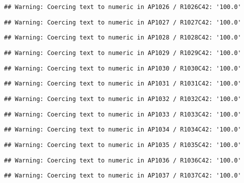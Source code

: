 \documentclass[
]{article}
\begin{document}
\begin{verbatim}
## Warning: Coercing text to numeric in AP1026 / R1026C42: '100.0'
\end{verbatim}

\begin{verbatim}
## Warning: Coercing text to numeric in AP1027 / R1027C42: '100.0'
\end{verbatim}

\begin{verbatim}
## Warning: Coercing text to numeric in AP1028 / R1028C42: '100.0'
\end{verbatim}

\begin{verbatim}
## Warning: Coercing text to numeric in AP1029 / R1029C42: '100.0'
\end{verbatim}

\begin{verbatim}
## Warning: Coercing text to numeric in AP1030 / R1030C42: '100.0'
\end{verbatim}

\begin{verbatim}
## Warning: Coercing text to numeric in AP1031 / R1031C42: '100.0'
\end{verbatim}

\begin{verbatim}
## Warning: Coercing text to numeric in AP1032 / R1032C42: '100.0'
\end{verbatim}

\begin{verbatim}
## Warning: Coercing text to numeric in AP1033 / R1033C42: '100.0'
\end{verbatim}

\begin{verbatim}
## Warning: Coercing text to numeric in AP1034 / R1034C42: '100.0'
\end{verbatim}

\begin{verbatim}
## Warning: Coercing text to numeric in AP1035 / R1035C42: '100.0'
\end{verbatim}

\begin{verbatim}
## Warning: Coercing text to numeric in AP1036 / R1036C42: '100.0'
\end{verbatim}

\begin{verbatim}
## Warning: Coercing text to numeric in AP1037 / R1037C42: '100.0'
\end{verbatim}
\end{document}
